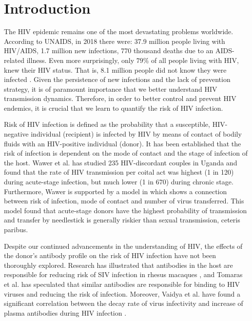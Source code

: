 \documentclass[]{elsarticle}
\theoremstyle{definition}
\begin{document}
\linenumbers
\clearpage
\tableofcontents
\clearpage
\section{Introduction}

The HIV epidemic remains one of the most devastating problems worldwide. According to UNAIDS, in 2018 there were: 37.9 million people living with HIV/AIDS, 1.7 million new infections, 770 thousand deaths due to an AIDS-related illness. Even more surprisingly, only $79\%$ of all people living with HIV, knew their HIV status. That is, 8.1 million people did not know they were infected \cite{UNAIDS}. Given the persistence of new infections and the lack of prevention strategy, it is of paramount importance that we better understand HIV transmission dynamics. Therefore, in order to better control and prevent HIV endemics, it is crucial that we learn to quantify the risk of HIV infection.

Risk of HIV infection is defined as the probability that a susceptible, HIV-negative individual (recipient) is infected by HIV by means of contact of bodily fluids with an HIV-positive individual (donor). It has been established that the risk of infection is dependent on the mode of contact and the stage of infection of the host. Wawer et al. \cite{Uganda} has studied 235 HIV-discordant couples in Uganda and found that the rate of HIV transmission per coital act was highest (1 in 120) during acute-stage infection, but much lower (1 in 670) during chronic stage. Furthermore, Wawer is supported by a model in \cite{AntibodyIntroduction} which shows a connection between risk of infection, mode of contact and number of virus transferred. This model found that acute-stage donors have the highest probability of transmission and transfer by needlestick is generally riskier than sexual transmission, ceteris paribus.

Despite our continued advancements in the understanding of HIV, the effects of the donor's antibody profile on the risk of HIV infection have not been thoroughly explored. Research has illustrated that antibodies in the host are responsible for reducing risk of SIV infection in rhesus macaques \cite{bistableSwitch}, and Tomaras et al. \cite{Tomaras} has speculated that similar antibodies are responsible for binding to HIV viruses and reducing the risk of infection. Moreover, Vaidya et al. \cite{CHIDPatients} have found a significant correlation between the decay rate of virus infectivity and increase of plasma antibodies during HIV infection \cite{CHIDPatients}.
\end{document}
